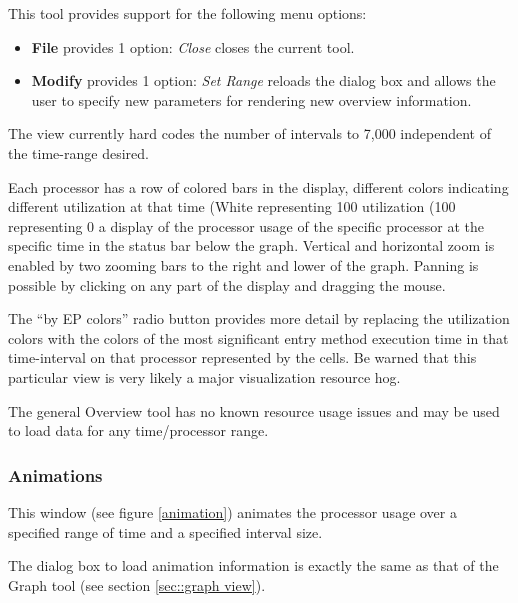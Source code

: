 \documentclass[10pt]{article}
\begin{document}
This tool provides support for the following menu options:

\begin{itemize}
\item {\bf File} provides 1 option: {\it Close} closes the current tool.
\item {\bf Modify} provides 1 option: {\it Set Range} reloads the
dialog box and allows the user to specify new parameters for rendering
new overview information.
\end{itemize}

The view currently hard codes the number of intervals to 7,000
independent of the time-range desired.

Each processor has a row of colored bars in the display, different
colors indicating different utilization at that time (White
representing 100%
utilization (100%
representing 0%
a display of the processor usage of the specific processor at the
specific time in the status bar below the graph. Vertical and
horizontal zoom is enabled by two zooming bars to the right and lower
of the graph. Panning is possible by clicking on any part of the
display and dragging the mouse.

The ``by EP colors'' radio button provides more detail by replacing
the utilization colors with the colors of the most significant entry
method execution time in that time-interval on that processor
represented by the cells. Be warned that this particular view is very
likely a major visualization resource hog.

The general Overview tool has no known resource usage issues and may
be used to load data for any time/processor range.

\subsubsection{Animations}

This window (see figure \ref{animation}) animates the processor usage
over a specified range of time and a specified interval size.

The dialog box to load animation information is exactly the same as
that of the Graph tool (see section \ref{sec::graph view}).
\end{document}
